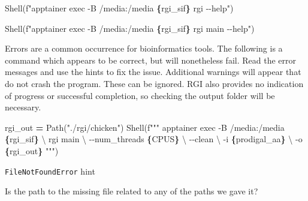 \documentclass[
]{book}
\newenvironment{Shaded}{\begin{snugshade}}{\end{snugshade}}
\newcommand{\CharTok}[1]{\textcolor[rgb]{0.31,0.60,0.02}{#1}}
\newcommand{\NormalTok}[1]{#1}
\newcommand{\OperatorTok}[1]{\textcolor[rgb]{0.81,0.36,0.00}{\textbf{#1}}}
\newcommand{\SpecialCharTok}[1]{\textcolor[rgb]{0.81,0.36,0.00}{\textbf{#1}}}
\newcommand{\SpecialStringTok}[1]{\textcolor[rgb]{0.31,0.60,0.02}{#1}}
\newcommand{\StringTok}[1]{\textcolor[rgb]{0.31,0.60,0.02}{#1}}
\begin{document}
\begin{Shaded}
\begin{Highlighting}[numbers=left,,]
\NormalTok{Shell(}\SpecialStringTok{f"apptainer exec {-}B /media:/media }\SpecialCharTok{\{}\NormalTok{rgi\_sif}\SpecialCharTok{\}}\SpecialStringTok{ rgi {-}{-}help"}\NormalTok{)}
\end{Highlighting}
\end{Shaded}

\begin{Shaded}
\begin{Highlighting}[numbers=left,,]
\NormalTok{Shell(}\SpecialStringTok{f"apptainer exec {-}B /media:/media }\SpecialCharTok{\{}\NormalTok{rgi\_sif}\SpecialCharTok{\}}\SpecialStringTok{ rgi main {-}{-}help"}\NormalTok{)}
\end{Highlighting}
\end{Shaded}

Errors are a common occurrence for bioinformatics tools. The following is a command which appears to be correct,
but will nonetheless fail. Read the error messages and use the hints to fix the issue. Additional warnings will appear
that do not crash the program. These can be ignored. RGI also provides no indication of progress or successful completion,
so checking the output folder will be necessary.

\begin{Shaded}
\begin{Highlighting}[numbers=left,,]
\NormalTok{rgi\_out }\OperatorTok{=}\NormalTok{ Path(}\StringTok{"./rgi/chicken"}\NormalTok{)}
\NormalTok{Shell(}\SpecialStringTok{f"""}
\SpecialStringTok{apptainer exec {-}B /media:/media }\SpecialCharTok{\{}\NormalTok{rgi\_sif}\SpecialCharTok{\}}\SpecialStringTok{ }\CharTok{\textbackslash{}}
\SpecialStringTok{    rgi main }\CharTok{\textbackslash{}}
\SpecialStringTok{        {-}{-}num\_threads }\SpecialCharTok{\{}\NormalTok{CPUS}\SpecialCharTok{\}}\SpecialStringTok{ }\CharTok{\textbackslash{}}
\SpecialStringTok{        {-}{-}clean }\CharTok{\textbackslash{}}
\SpecialStringTok{        {-}i }\SpecialCharTok{\{}\NormalTok{prodigal\_aa}\SpecialCharTok{\}}\SpecialStringTok{ }\CharTok{\textbackslash{}}
\SpecialStringTok{        {-}o }\SpecialCharTok{\{}\NormalTok{rgi\_out}\SpecialCharTok{\}}
\SpecialStringTok{"""}\NormalTok{)}
\end{Highlighting}
\end{Shaded}

\texttt{FileNotFoundError} hint

Is the path to the missing file related to any of the paths we gave it?
\end{document}
